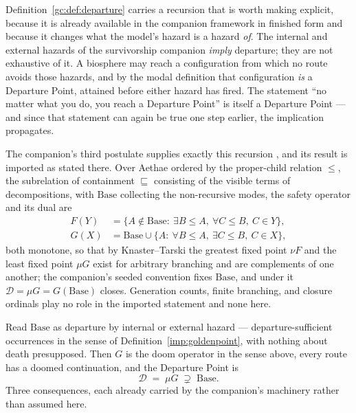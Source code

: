 Definition~\ref{gc:def:departure} carries a recursion that is worth
making explicit, because it is already available in the companion
framework in finished form and because it changes what the model's
hazard is a hazard \emph{of}. The internal and external hazards of the survivorship companion \cite{GoldenSurvivorship} \emph{imply}
departure; they are not exhaustive of it. A biosphere may reach a
configuration from which no route avoids those hazards, and by the
modal definition that configuration \emph{is} a Departure Point,
attained before either hazard has fired. The statement ``no matter what
you do, you reach a Departure Point'' is itself a Departure Point ---
and since that statement can again be true one step earlier, the
implication propagates.

\begin{remark}
\label{gc:rem:thirdpostulate}
The companion's third postulate supplies exactly this recursion
\cite{Aethus}, and its result is imported as stated there. Over Aethae ordered by the proper-child relation $\le$, the subrelation of containment $\sqsubseteq$ consisting of the visible terms of decompositions, with
$\mathrm{Base}$ collecting the non-recursive modes, the safety operator
and its dual are
\begin{align*}
F(Y)&=\bigl\{A\notin\mathrm{Base}:\ \exists B\le A,\
\forall C\le B,\ C\in Y\bigr\},\\
G(X)&=\mathrm{Base}\cup\bigl\{A:\ \forall B\le A,\
\exists C\le B,\ C\in X\bigr\},
\end{align*}
both monotone, so that by Knaster--Tarski the greatest fixed point
$\nu F$ and the least fixed point $\mu G$ exist for arbitrary branching
and are complements of one another; the companion's seeded convention
fixes $\mathrm{Base}$, and under it $\mathcal D=\mu G=G(\mathrm{Base})$
closes. Generation counts, finite branching, and closure ordinals play
no role in the imported statement and none here.

Read $\mathrm{Base}$ as departure by internal or external hazard
--- departure-sufficient occurrences in the sense of
Definition~\ref{imp:goldenpoint}, with nothing about death presupposed.
Then $G$ is the doom operator in the sense above, every route has a
doomed continuation, and the Departure Point is
\begin{equation}\label{gc:eq:departurefix}
\mathcal{D}\;=\;\mu G\;\supsetneq\;\mathrm{Base}.
\end{equation}
Three consequences, each already carried by the companion's
machinery rather than assumed here.


\end{remark}

